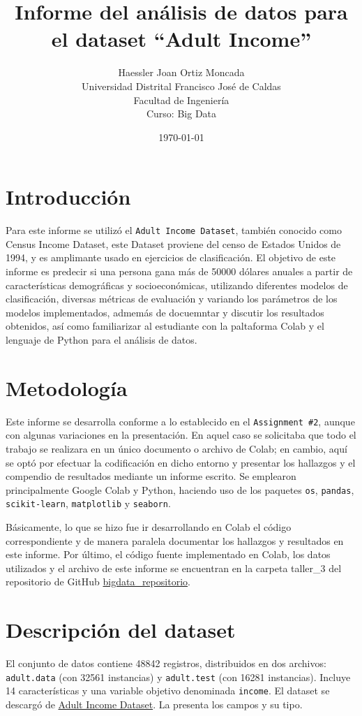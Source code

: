 \documentclass[12pt,a4paper]{article}
\title{\textbf{Informe del análisis de datos para el dataset ``Adult Income''}}
\author{Haessler Joan Ortiz Moncada \\[0.5cm]
        Universidad Distrital Francisco José de Caldas \\
        Facultad de Ingeniería \\
        Curso: Big Data}
\date{\today}
\begin{document}
\maketitle

\section{Introducción}
Para este informe se utilizó el  \texttt{Adult Income Dataset}, también conocido como Census Income Dataset,
este Dataset proviene del censo de Estados Unidos de 1994, y es amplimante usado en ejercicios de clasificación. 
El objetivo de este informe es predecir si una persona gana más de \num{50000} dólares anuales a partir 
de características demográficas y socioeconómicas, utilizando diferentes modelos de clasificación, diversas 
métricas de evaluación y variando los parámetros de los modelos implementados, admemás de docuemntar y discutir 
los resultados obtenidos, así como familiarizar al estudiante con la paltaforma Colab y el lenguaje de Python para 
el análisis de datos.

\section{Metodología}
Este informe se desarrolla conforme a lo establecido en el \texttt{Assignment \#2}, aunque con algunas variaciones 
en la presentación. En aquel caso se solicitaba que todo el trabajo se realizara en un único documento o 
archivo de Colab; en cambio, aquí se optó por efectuar la codificación en dicho entorno y presentar los 
hallazgos y el compendio de resultados mediante un informe escrito. Se emplearon principalmente Google Colab y Python, 
haciendo uso de los paquetes \texttt{os}, \texttt{pandas}, \texttt{scikit-learn}, \texttt{matplotlib} y \texttt{seaborn}.

Básicamente, lo que se hizo fue ir desarrollando en Colab el código correspondiente y de manera 
paralela documentar los hallazgos y resultados en este informe. Por último, el código fuente implementado en Colab, 
los datos utilizados y el archivo de este informe se encuentran en la carpeta taller\_3 del repositorio de 
GitHub \href{https://github.com/HaesslerOrtiz/bigdata}{bigdata\_repositorio}.

\section{Descripción del dataset}
El conjunto de datos contiene \num{48842} registros, distribuidos en dos archivos: 
\texttt{adult.data} (con \num{32561} instancias) y \texttt{adult.test} (con \num{16281} instancias). 
Incluye 14 características y una variable objetivo denominada \texttt{income}. El dataset se descargó de 
\href{https://archive.ics.uci.edu/dataset/2/adult}{Adult Income Dataset}.
La  presenta los campos y su tipo.
\end{document}
